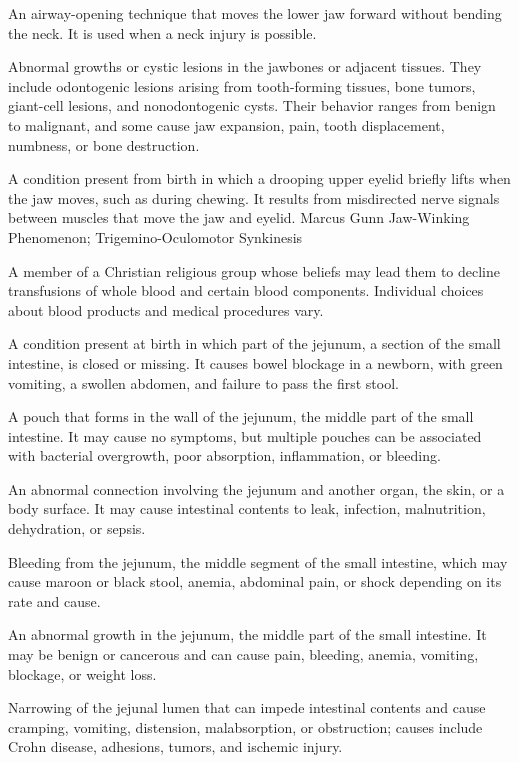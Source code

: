  An airway-opening technique that moves the lower jaw forward without bending the neck. It is used when a neck injury is possible.

 Abnormal growths or cystic lesions in the jawbones or
adjacent tissues. They include odontogenic lesions arising from tooth-forming tissues,
bone tumors, giant-cell lesions, and nonodontogenic cysts. Their behavior ranges from
benign to malignant, and some cause jaw expansion, pain, tooth displacement, numbness,
or bone destruction.

 A condition present from birth in which a drooping upper eyelid briefly lifts when the jaw moves, such as during chewing. It results from misdirected nerve signals between muscles that move the jaw and eyelid.
\synonyms
Marcus Gunn Jaw-Winking Phenomenon; Trigemino-Oculomotor Synkinesis

 A member of a Christian religious group whose beliefs may lead them to decline transfusions of whole blood and certain blood components. Individual choices about blood products and medical procedures vary.

 A condition present at birth in which part of the jejunum, a section of the small intestine, is closed or missing. It causes bowel blockage in a newborn, with green vomiting, a swollen abdomen, and failure to pass the first stool.

 A pouch that forms in the wall of the jejunum, the middle part of the small intestine. It may cause no symptoms, but multiple pouches can be associated with bacterial overgrowth, poor absorption, inflammation, or bleeding.

 An abnormal connection involving the jejunum and another organ, the skin, or a body surface. It may cause intestinal contents to leak, infection, malnutrition, dehydration, or sepsis.

 Bleeding from the jejunum, the middle segment of the small intestine, which may cause maroon or black stool, anemia, abdominal pain, or shock depending on its rate and cause.

 An abnormal growth in the jejunum, the middle part of the small intestine. It may be benign or cancerous and can cause pain, bleeding, anemia, vomiting, blockage, or weight loss.

 Narrowing of the jejunal lumen that can impede intestinal contents and cause cramping, vomiting, distension, malabsorption, or obstruction; causes include Crohn disease, adhesions, tumors, and ischemic injury.

